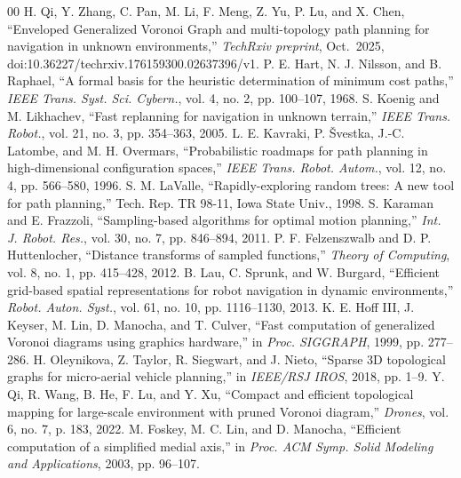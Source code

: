 \documentclass[conference]{IEEEtran}
\begin{document}
\begin{thebibliography}{00}
 H. Qi, Y. Zhang, C. Pan, M. Li, F. Meng, Z. Yu, P. Lu, and X. Chen, ``Enveloped Generalized Voronoi Graph and multi-topology path planning for navigation in unknown environments,'' \textit{TechRxiv preprint}, Oct.\ 2025, doi:10.36227/techrxiv.176159300.02637396/v1.
 P. E. Hart, N. J. Nilsson, and B. Raphael, ``A formal basis for the heuristic determination of minimum cost paths,'' \textit{IEEE Trans. Syst. Sci. Cybern.}, vol. 4, no. 2, pp. 100--107, 1968.
 S. Koenig and M. Likhachev, ``Fast replanning for navigation in unknown terrain,'' \textit{IEEE Trans. Robot.}, vol. 21, no. 3, pp. 354--363, 2005.
 L. E. Kavraki, P. \v{S}vestka, J.-C. Latombe, and M. H. Overmars, ``Probabilistic roadmaps for path planning in high-dimensional configuration spaces,'' \textit{IEEE Trans. Robot. Autom.}, vol. 12, no. 4, pp. 566--580, 1996.
 S. M. LaValle, ``Rapidly-exploring random trees: A new tool for path planning,'' Tech. Rep. TR 98-11, Iowa State Univ., 1998.
 S. Karaman and E. Frazzoli, ``Sampling-based algorithms for optimal motion planning,'' \textit{Int. J. Robot. Res.}, vol. 30, no. 7, pp. 846--894, 2011.
 P. F. Felzenszwalb and D. P. Huttenlocher, ``Distance transforms of sampled functions,'' \textit{Theory of Computing}, vol. 8, no. 1, pp. 415--428, 2012.
 B. Lau, C. Sprunk, and W. Burgard, ``Efficient grid-based spatial representations for robot navigation in dynamic environments,'' \textit{Robot. Auton. Syst.}, vol. 61, no. 10, pp. 1116--1130, 2013.
 K. E. Hoff III, J. Keyser, M. Lin, D. Manocha, and T. Culver, ``Fast computation of generalized Voronoi diagrams using graphics hardware,'' in \textit{Proc. SIGGRAPH}, 1999, pp. 277--286.
 H. Oleynikova, Z. Taylor, R. Siegwart, and J. Nieto, ``Sparse 3D topological graphs for micro-aerial vehicle planning,'' in \textit{IEEE/RSJ IROS}, 2018, pp. 1--9.
 Y. Qi, R. Wang, B. He, F. Lu, and Y. Xu, ``Compact and efficient topological mapping for large-scale environment with pruned Voronoi diagram,'' \textit{Drones}, vol. 6, no. 7, p. 183, 2022.
 M. Foskey, M. C. Lin, and D. Manocha, ``Efficient computation of a simplified medial axis,'' in \textit{Proc. ACM Symp. Solid Modeling and Applications}, 2003, pp. 96--107.

\end{thebibliography}
\end{document}
